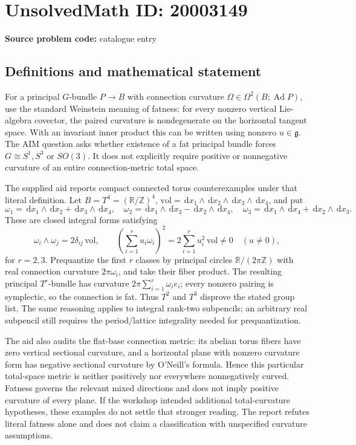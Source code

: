 \documentclass[11pt]{article}
\newcommand{\Z}{\mathbb{Z}}
\newcommand{\R}{\mathbb{R}}
\newcommand{\dd}{\,\mathrm{d}}
\begin{document}
\section*{UnsolvedMath ID: 20003149}
\textbf{Source problem code:} catalogue entry
\subsection{Definitions and mathematical statement}
For a principal \(G\)-bundle \(P\to B\) with connection curvature \(\Omega\in\Omega^2(B;\operatorname{Ad}P)\), use the standard Weinstein meaning of fatness: for every nonzero vertical Lie-algebra covector, the paired curvature is nondegenerate on the horizontal tangent space. With an invariant inner product this can be written using nonzero \(u\in\mathfrak g\). The AIM question asks whether existence of a fat principal bundle forces \(G\cong S^1, S^3\) or \(SO(3)\). It does not explicitly require positive or nonnegative curvature of an entire connection-metric total space.

The supplied aid reports compact connected torus counterexamples under that literal definition. Let \(B=T^4=(\R/\Z)^4\), \(\mathrm{vol}=\dd x_1\wedge\dd x_2\wedge\dd x_3\wedge\dd x_4\), and put
\[
\omega_1=\dd x_1\wedge\dd x_2+\dd x_3\wedge\dd x_4,\quad
\omega_2=\dd x_1\wedge\dd x_3-\dd x_2\wedge\dd x_4,\quad
\omega_3=\dd x_1\wedge\dd x_4+\dd x_2\wedge\dd x_3.
\]
These are closed integral forms satisfying
\[
\omega_i\wedge\omega_j=2\delta_{ij}\,\mathrm{vol},\qquad
\left(\sum_{i=1}^ru_i\omega_i\right)^2=2\sum_{i=1}^ru_i^2\,\mathrm{vol}\ne0
\quad(u\ne0),
\]
for \(r=2,3\). Prequantize the first \(r\) classes by principal circles \(\R/(2\pi\Z)\) with real connection curvature \(2\pi\omega_i\), and take their fiber product. The resulting principal \(T^r\)-bundle has curvature \(2\pi\sum_{i=1}^r\omega_i e_i\); every nonzero pairing is symplectic, so the connection is fat. Thus \(T^2\) and \(T^3\) disprove the stated group list. The same reasoning applies to integral rank-two subpencils; an arbitrary real subpencil still requires the period/lattice integrality needed for prequantization.

The aid also audits the flat-base connection metric: its abelian torus fibers have zero vertical sectional curvature, and a horizontal plane with nonzero curvature form has negative sectional curvature by O'Neill's formula. Hence this particular total-space metric is neither positively nor everywhere nonnegatively curved. Fatness governs the relevant mixed directions and does not imply positive curvature of every plane. If the workshop intended additional total-curvature hypotheses, these examples do not settle that stronger reading. The report refutes literal fatness alone and does not claim a classification with unspecified curvature assumptions.
\end{document}
